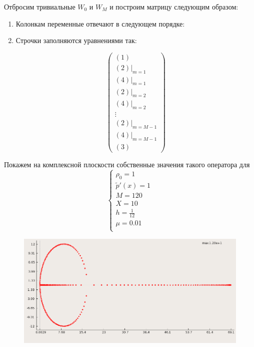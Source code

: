 \documentclass[a4paper, 11pt]{article}
\begin{document}
Отбросим тривиальные $W_0$ и $W_M$ и построим матрицу следующим образом:
\begin{enumerate}
\item Колонкам переменные отвечают в следующем порядке: 


\item Строчки заполняются уравнениями так:
\begin{center}
$$
\begin{pmatrix}
(1) \\ 
(2)\vert_{m = 1} \\
(4)\vert_{m=1} \\
(2)\vert_{m=2} \\
(4)\vert_{m=2} \\
 \vdots \\
(2)\vert_{m=M-1} \\
(4)\vert_{m=M-1} \\ 
(3)
\end{pmatrix}$$
\end{center}
\end{enumerate}

Покажем на комплексной плоскости собственные значения такого оператора для
$$
\begin{cases}
\rho_0 = 1 \\
\tilde{p}' (x) = 1 \\
M = 120 \\
X = 10 \\
h = \frac{1}{12} \\
\mu = 0.01 \\
\end{cases}
$$

\begin{figure}[H]
		\includegraphics[width=1\linewidth]{plot.png}
\end{figure}
\end{document}
